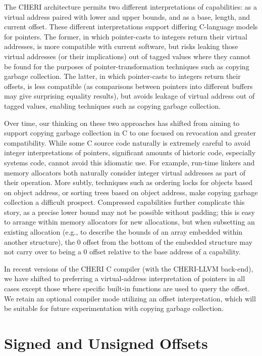 The CHERI architecture permits two different interpretations of capabilities:
as a virtual address paired with lower and upper bounds, and as a base,
length, and current offset.
These different interpretations support differing C-language models for
pointers.
The former, in which pointer-casts to integers return their virtual addresses,  is more compatible with current software, but risks leaking those virtual
addresses (or their implications) out of tagged values where they cannot be
found for the purposes of pointer-transformation techniques such as copying
garbage collection.
The latter, in which pointer-casts to integers return their offsets, is less
compatible (as comparisons between pointers into different buffers may give
surprising equality results), but avoids leakage of virtual address out of
tagged values, enabling techniques such as copying garbage collection.

Over time, our thinking on these two approaches has shifted from aiming to
support copying garbage collection in C to one focused on revocation and
greater compatibility.
While some C source code naturally is extremely careful to avoid integer
interpretations of pointers, significant amounts of historic code, especially
systems code, cannot avoid this idiomatic use.
For example, run-time linkers and memory allocators both naturally consider
integer virtual addresses as part of their operation.
More subtly, techniques such as ordering locks for objects based on object
address, or sorting trees based on object address, make copying garbage
collection a difficult prospect.
Compressed capabilities further complicate this story, as a precise lower
bound may not be possible without padding; this is easy to arrange within
memory allocators for new allocations, but when subsetting an existing
allocation (e.g., to describe the bounds of an array embedded within another
structure), the 0 offset from the bottom of the embedded structure may not
carry over to being a 0 offset relative to the base address of a capability.

In recent versions of the CHERI C compiler (with the CHERI-LLVM
back-end), we have shifted to preferring a virtual-address
interpretation of pointers in all cases except those where specific
built-in functions are used to query the offset.  We retain an
optional compiler mode utilizing an offset interpretation, which will
be suitable for future experimentation with copying garbage
collection.

\section{Signed and Unsigned Offsets}

